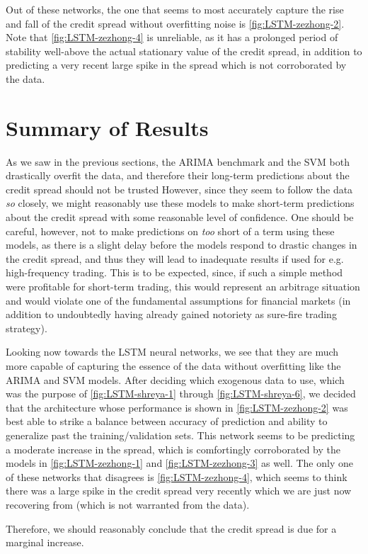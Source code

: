 \documentclass[12pt]{article}
\begin{document}
    Out of these networks, the one that seems to most accurately capture the rise and fall of the credit spread without overfitting noise is
    \autoref{fig:LSTM-zezhong-2}.
    Note that \autoref{fig:LSTM-zezhong-4} is unreliable, as it has a prolonged period of stability well-above the actual stationary value of the credit spread,
    in addition to predicting a very recent large spike in the spread which is not corroborated by the data.

\section{Summary of Results}
As we saw in the previous sections, the ARIMA benchmark and the SVM both drastically overfit the data,
and therefore their long-term predictions about the credit spread should not be trusted
However, since they seem to follow the data {\it so} closely,
we might reasonably use these models to make short-term predictions about the credit spread with some reasonable level of confidence.
One should be careful, however, not to make predictions on {\it too} short of a term using these models, as there is a slight delay before the models respond
to drastic changes in the credit spread, and thus they will lead to inadequate results if used for e.g. high-frequency trading.
This is to be expected, since, if such a simple method were profitable for short-term trading,
this would represent an arbitrage situation and would violate one of the fundamental assumptions for financial markets
(in addition to undoubtedly having already gained notoriety as sure-fire trading strategy).

Looking now towards the LSTM neural networks, we see that they are much more capable of capturing the essence of the data without overfitting like the ARIMA and SVM models.
After deciding which exogenous data to use, which was the purpose of \autoref{fig:LSTM-shreya-1} through \autoref{fig:LSTM-shreya-6},
we decided that the architecture whose performance is shown in \autoref{fig:LSTM-zezhong-2}
was best able to strike a balance between accuracy of prediction and ability to generalize past the training/validation sets.
This network seems to be predicting a moderate increase in the spread,
which is comfortingly corroborated by the models in \autoref{fig:LSTM-zezhong-1} and \autoref{fig:LSTM-zezhong-3} as well.
The only one of these networks that disagrees is \autoref{fig:LSTM-zezhong-4},
which seems to think there was a large spike in the credit spread very recently which we are just now recovering from (which is not warranted from the data).

Therefore, we should reasonably conclude that the credit spread is due for a marginal increase.
\end{document}
